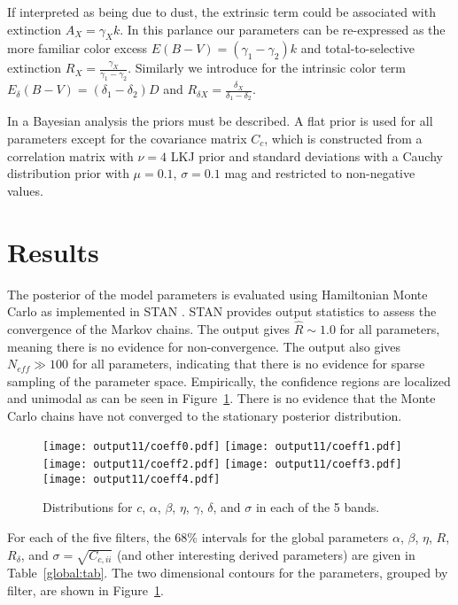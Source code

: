 \documentclass{aastex}   	%
\begin{document}
If interpreted as being due to dust, the extrinsic term could be associated with extinction $A_X = \gamma_X k$.  In
this parlance our parameters can be re-expressed as the more familiar color excess
$E(B-V) = (\gamma_1-\gamma_2) k$ and total-to-selective extinction $R_X = \frac{\gamma_X}{\gamma_1-\gamma_2}$.
Similarly we introduce for the intrinsic color term $E_\delta(B-V) = (\delta_1-\delta_2) D$ and $R_{\delta X} = \frac{\delta_X}{\delta_1-\delta_2}$.

In a Bayesian analysis the priors must be described.  A flat prior is used for all parameters except
for the covariance matrix $C_c$, which is constructed from a correlation matrix with  $\nu=4$  LKJ prior
\citep{Lewandowski20091989} and standard
deviations with a  Cauchy distribution prior with
 $\mu=0.1$, $\sigma=0.1$ mag and restricted to non-negative values.

\section{Results}
\label{results:sec}
The posterior of the model parameters is evaluated using Hamiltonian Monte Carlo as implemented in
STAN \citep{stan}. STAN provides output statistics to assess
the convergence of the Markov chains.  The output gives $\hat{R} \sim 1.0$ for all parameters, meaning there is no evidence for non-convergence.  The
output also gives  $N_{eff} \gg 100$ for all parameters, indicating that there is no evidence for sparse sampling of the parameter space.
Empirically, the confidence regions are localized and unimodal as can be seen in  Figure~\ref{global:fig}.  There is no evidence that
the Monte Carlo chains have not converged to the stationary posterior distribution.

\begin{figure}[htbp] %
   \centering
   \texttt{[image: output11/coeff0.pdf]} 
   \texttt{[image: output11/coeff1.pdf]} 
   \texttt{[image: output11/coeff2.pdf]} 
      \texttt{[image: output11/coeff3.pdf]} 
         \texttt{[image: output11/coeff4.pdf]} 
            \caption{Distributions for $c$, $\alpha$, $\beta$, $\eta$, $\gamma$, $\delta$, and $\sigma$ in each of the 5 bands.   \label{global:fig}}
\end{figure}


For each of the five filters, the 68\% intervals for the global parameters $\alpha$, $\beta$, $\eta$, $R$, $R_\delta$, and $\sigma = \sqrt{C_{c,ii}}$
(and other interesting derived parameters)
are given in Table~\ref{global:tab}.
The two dimensional contours for the parameters, grouped by filter, are shown in Figure~\ref{global:fig}.
\end{document}
